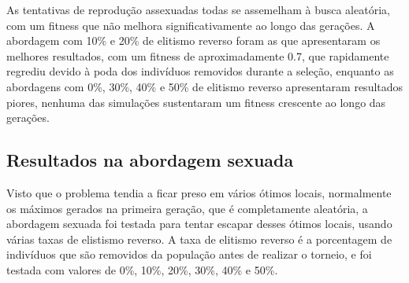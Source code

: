 \documentclass[12pt]{article}
\begin{document}
As tentativas de reprodução assexuadas todas se assemelham à busca aleatória, com um fitness que não melhora significativamente ao longo das gerações. A abordagem com 10\% e 20\% de elitismo reverso foram as que apresentaram os melhores resultados, com um fitness de aproximadamente 0.7, que rapidamente regrediu devido à poda dos indivíduos removidos durante a seleção, enquanto as abordagens com 0\%, 30\%, 40\% e 50\% de elitismo reverso apresentaram resultados piores, nenhuma das simulações sustentaram um fitness crescente ao longo das gerações.

\subsection{Resultados na abordagem sexuada}

Visto que o problema tendia a ficar preso em vários ótimos locais, normalmente os máximos gerados na primeira geração, que é completamente aleatória, a abordagem sexuada foi testada para tentar escapar desses ótimos locais, usando várias taxas de elistismo reverso. A taxa de elitismo reverso é a porcentagem de indivíduos que são removidos da população antes de realizar o torneio, e foi testada com valores de 0\%, 10\%, 20\%, 30\%, 40\% e 50\%.
\end{document}
